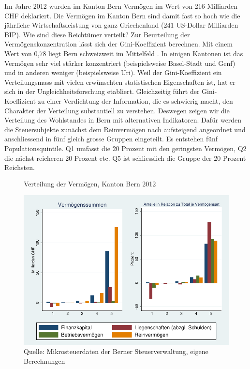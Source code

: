 \documentclass[a4paper, 12pt,liststotoc]{scrartcl}
\numberwithin{equation}{section}
\begin{document}
Im Jahre 2012 wurden im Kanton Bern Vermögen im Wert von 216 Milliarden
CHF deklariert. Die Vermögen im Kanton Bern sind damit fast so hoch wie
die jährliche Wirtschaftsleistung von ganz Griechenland (241 US-Dollar
Milliarden BIP). Wie sind diese Reichtümer verteilt? Zur Beurteilung der
Vermögenskonzentration lässt sich der Gini-Koeffizient berechnen. Mit
einem Wert von 0,78 liegt Bern schweizweit im Mittelfeld \parencite{jann2014}. In einigen Kantonen ist das Vermögen sehr viel stärker
konzentriert (beispielsweise Basel-Stadt und Genf) und in anderen
weniger (beispielsweise Uri). Weil der Gini-Koeffizient ein
Verteilungsmass mit vielen erwünschten statistischen Eigenschaften ist,
hat er sich in der Ungleichheitsforschung etabliert. Gleichzeitig führt
der Gini-Koeffizient zu einer Verdichtung der Information, die es
schwierig macht, den Charakter der Verteilung substantiell zu verstehen.
Deswegen zeigen wir die Verteilung des Wohlstandes in Bern mit
alternativen Indikatoren. Dafür werden die Steuersubjekte zunächst dem
Reinvermögen nach aufsteigend angeordnet und anschliessend in fünf
gleich grosse Gruppen eingeteilt. Es entstehen fünf Populationsquintile.
Q1 umfasst die 20 Prozent mit den geringsten Vermögen, Q2 die nächst
reicheren 20 Prozent etc. Q5 ist schliesslich die Gruppe der 20 Prozent
Reichsten.

\begin{figure}[!ht]
  \caption{Verteilung der Vermögen, Kanton Bern 2012}
  \label{fig:verteilung_vermoegen}
  \centering
    \includegraphics[width=\textwidth]{figure/VermoegenQuintil}
  \caption*{Quelle: Mikrosteuerdaten der Berner Steuerverwaltung, eigene Berechnungen}
\end{figure}
\end{document}
